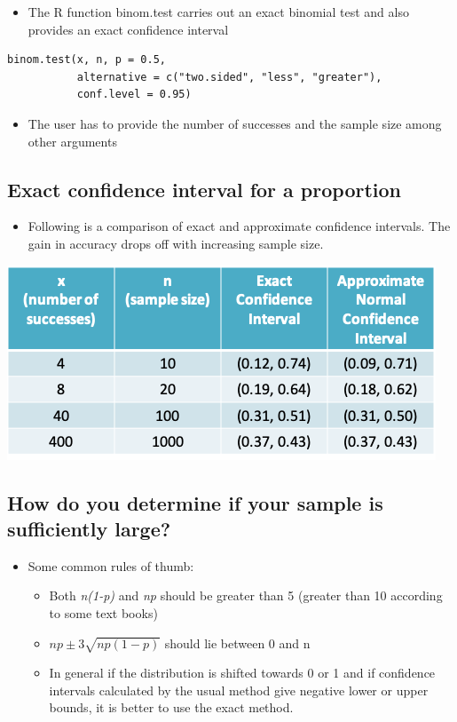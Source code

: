 \documentclass[
]{book}
\providecommand{\tightlist}{%
  \setlength{\itemsep}{0pt}\setlength{\parskip}{0pt}}
\begin{document}
\begin{itemize}
\tightlist
\item
  The R function binom.test carries out an exact binomial test and also provides an exact confidence interval
\end{itemize}

\begin{verbatim}
binom.test(x, n, p = 0.5,
           alternative = c("two.sided", "less", "greater"),
           conf.level = 0.95)
\end{verbatim}

\begin{itemize}
\tightlist
\item
  The user has to provide the number of successes and the sample size among other arguments
\end{itemize}

\hypertarget{exact-confidence-interval-for-a-proportion-2}{%
\subsection{Exact confidence interval for a proportion}\label{exact-confidence-interval-for-a-proportion-2}}

\begin{itemize}
\tightlist
\item
  Following is a comparison of exact and approximate confidence intervals. The gain in accuracy drops off with increasing sample size.
\end{itemize}

\includegraphics[width=0.5\linewidth]{./7_28}

\hypertarget{how-do-you-determine-if-your-sample-is-sufficiently-large}{%
\subsection{How do you determine if your sample is sufficiently large?}\label{how-do-you-determine-if-your-sample-is-sufficiently-large}}

\begin{itemize}
\tightlist
\item
  Some common rules of thumb:

  \begin{itemize}
  \tightlist
  \item
    Both \emph{n(1-p)} and \emph{np} should be greater than 5 (greater than 10 according to some text books)
  \item
    \(np\pm3\sqrt{np(1-p)}\) should lie between 0 and n
  \item
    In general if the distribution is shifted towards 0 or 1 and if confidence intervals calculated by the usual method give negative lower or upper bounds, it is better to use the exact method.
  \end{itemize}
\end{itemize}
\end{document}
